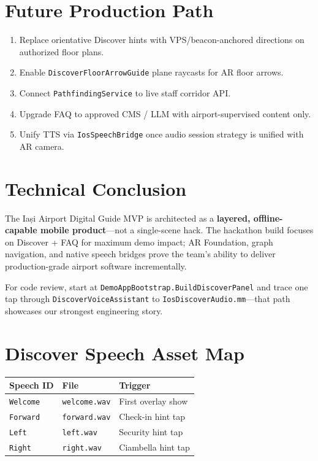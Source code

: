 \documentclass[11pt,a4paper]{article}
\begin{document}
\section{Future Production Path}

\begin{enumerate}
    \item Replace orientative Discover hints with VPS/beacon-anchored directions on authorized floor plans.
    \item Enable \texttt{DiscoverFloorArrowGuide} plane raycasts for AR floor arrows.
    \item Connect \texttt{PathfindingService} to live staff corridor API.
    \item Upgrade FAQ to approved CMS / LLM with airport-supervised content only.
    \item Unify TTS via \texttt{IosSpeechBridge} once audio session strategy is unified with AR camera.
\end{enumerate}

\section{Technical Conclusion}

The Iași Airport Digital Guide MVP is architected as a \textbf{layered, offline-capable mobile product}---not a single-scene hack. The hackathon build focuses on Discover + FAQ for maximum demo impact; AR Foundation, graph navigation, and native speech bridges prove the team's ability to deliver production-grade airport software incrementally.

For code review, start at \texttt{DemoAppBootstrap.BuildDiscoverPanel} and trace one tap through \texttt{DiscoverVoiceAssistant} to \texttt{IosDiscoverAudio.mm}---that path showcases our strongest engineering story.

\appendix

\section{Discover Speech Asset Map}

\begin{table}[H]
\centering
\begin{tabular}{@{}lll@{}}
\toprule
\textbf{Speech ID} & \textbf{File} & \textbf{Trigger} \\
\midrule
\texttt{Welcome} & \texttt{welcome.wav} & First overlay show \\
\texttt{Forward} & \texttt{forward.wav} & Check-in hint tap \\
\texttt{Left} & \texttt{left.wav} & Security hint tap \\
\texttt{Right} & \texttt{right.wav} & Ciambella hint tap \\
\bottomrule
\end{tabular}
\end{table}
\end{document}
